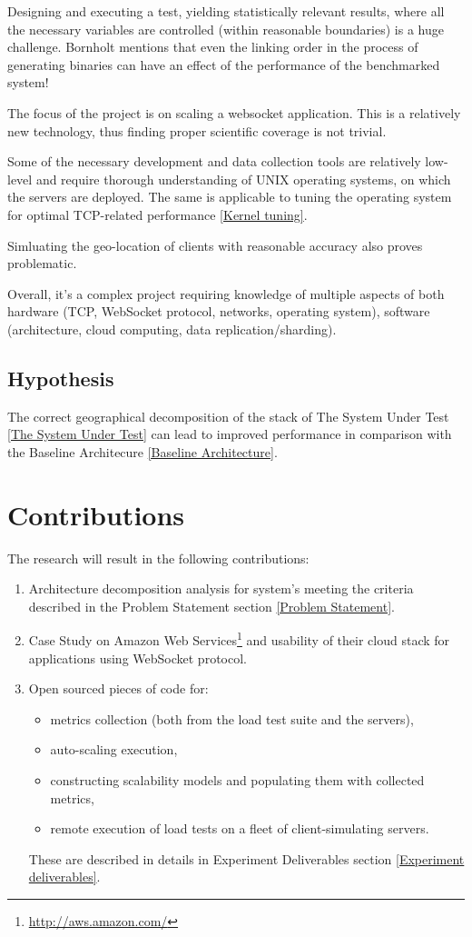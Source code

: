 \documentclass{uvamscse}
\begin{document}
Designing and executing a test, yielding statistically relevant results, where all the necessary variables are controlled (within reasonable boundaries) is a huge challenge. Bornholt \cite{BornBen} mentions that even the linking order in the process of generating binaries can have an effect of the performance of the benchmarked system!

The focus of the project is on scaling a websocket application. This is a relatively new technology, thus finding proper scientific coverage is not trivial.

Some of the necessary development and data collection tools are relatively low-level and require thorough understanding of UNIX operating systems, on which the servers are deployed. The same is applicable to tuning the operating system for optimal TCP-related performance \ref{Kernel tuning}.

Simluating the geo-location of clients with reasonable accuracy also proves problematic.

Overall, it’s a complex project requiring knowledge of multiple aspects of both hardware (TCP, WebSocket protocol, networks, operating system), software (architecture, cloud computing, data replication/sharding).

\subsection{Hypothesis}
The correct geographical decomposition of the stack of The System Under Test \ref{The System Under Test} can lead to improved performance in comparison with the Baseline Architecure \ref{Baseline Architecture}.

\section{Contributions}
The research will result in the following contributions:

\begin{enumerate}
  \item Architecture decomposition analysis for system's meeting the criteria described in the Problem Statement section \ref{Problem Statement}.
  \item Case Study on Amazon Web Services\footnote{\url{http://aws.amazon.com/}} and usability of their cloud stack for applications using WebSocket protocol.
  \item Open sourced pieces of code for:
  \begin{itemize}
    \item metrics collection (both from the load test suite and the servers),
    \item auto-scaling execution,
    \item constructing scalability models and populating them with collected metrics,
    \item remote execution of load tests on a fleet of client-simulating servers.
  \end{itemize}
  These are described in details in Experiment Deliverables section \ref{Experiment deliverables}.
\end{enumerate}
\end{document}
